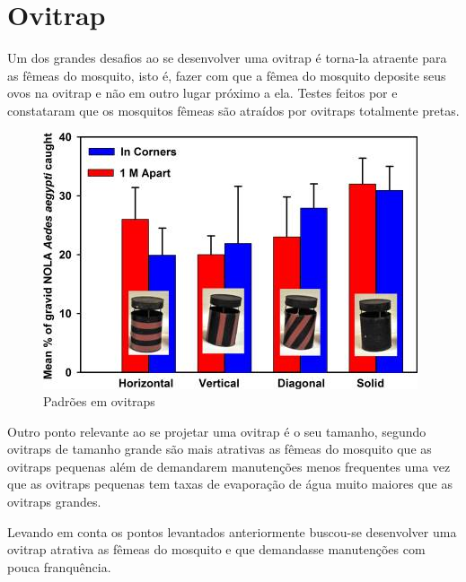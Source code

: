 \documentclass[
	12pt,				%
	openright,			%
	oneside,			%
	a4paper,			%
	chapter=TITLE,		%
	english,			%
	brazil				%
	]{abntex2}
\begin{document}
\section{Ovitrap}
Um dos grandes desafios ao se desenvolver uma ovitrap é torna-la atraente para as fêmeas do mosquito, isto é, fazer com que a fêmea do mosquito deposite seus ovos na ovitrap e não em outro lugar próximo a ela. Testes feitos por \cite{DAVIDF2011} e \cite{VALERIE2016} constataram que os mosquitos fêmeas são atraídos por ovitraps totalmente pretas.

\begin{figure}[H]
\centering
\includegraphics[scale=0.8]{imagens/tileshop.jpeg}
\caption{Padrões em ovitraps}
\end{figure}

Outro ponto relevante ao se projetar uma ovitrap é o seu tamanho, segundo \cite{BRIANJJOHNSON2017} ovitraps de tamanho grande são mais atrativas as fêmeas do mosquito que as ovitraps pequenas
além de demandarem manutenções menos frequentes uma vez que as ovitraps pequenas tem taxas de evaporação de água muito maiores que as ovitraps grandes.

Levando em conta os pontos levantados anteriormente buscou-se desenvolver uma ovitrap atrativa as fêmeas do mosquito e que demandasse manutenções com pouca franquência.

\newpage
\end{document}
